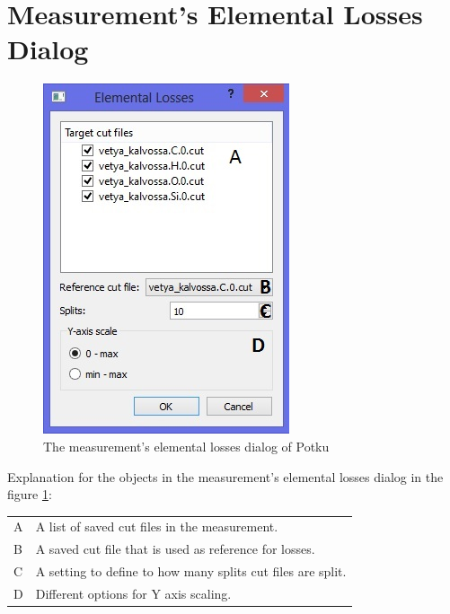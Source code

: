 \documentclass{scrreprt}
\begin{document}
\section{Measurement's Elemental Losses Dialog}\label{measurement-dialogelemloss}
\begin{figure}[H]
\centering
\includegraphics[scale=1]{measurement-dialogelemloss}
\caption{The measurement's elemental losses dialog of Potku}
\label{fig-dialogelemloss}
\end{figure}
Explanation for the objects in the measurement's elemental losses dialog in the figure \ref{fig-dialogelemloss}:

\begin{tabular}{ll}
A & A list of saved cut files in the measurement.\\
B & A saved cut file that is used as reference for losses.\\
C & A setting to define to how many splits cut files are split.\\
D & Different options for Y axis scaling.\\
\end{tabular}

\end{document}

